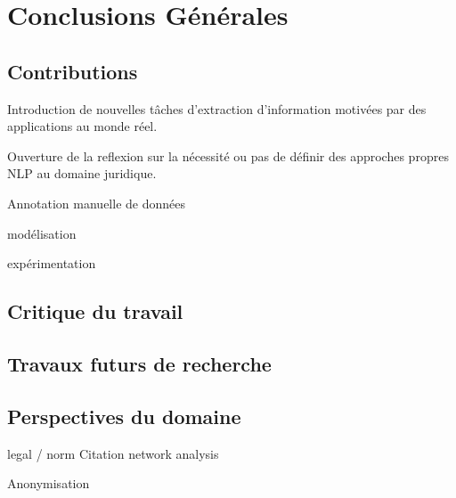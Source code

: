 \chapter*{Conclusions Générales}
\label{chap:conclusion}

\section{Contributions}
\label{sec:conclusion:contributions}
Introduction de nouvelles tâches d'extraction d'information motivées par des applications au monde réel.

Ouverture de la reflexion sur la nécessité ou pas de définir des approches propres NLP au domaine juridique.

Annotation manuelle de données

modélisation

expérimentation


\section{Critique du travail}
\label{sec:conclusion:critique}

\section{Travaux futurs de recherche}
\label{sec:conclusion:extensions}

\section{Perspectives du domaine}
\label{sec:conclusion:perspectives}
legal / norm Citation network analysis

Anonymisation